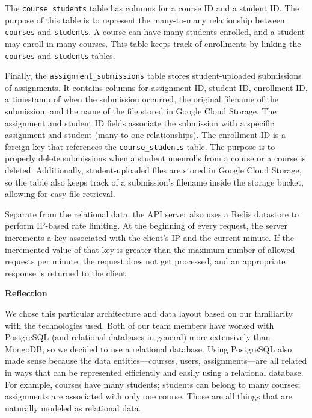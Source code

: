 \documentclass[11pt]{article}
\begin{document}
The \texttt{course\_students} table has columns for a course ID and a student ID. The purpose of this table is to represent the many-to-many relationship between \texttt{courses} and \texttt{students}. A course can have many students enrolled, and a student may enroll in many courses. This table keeps track of enrollments by linking the \texttt{courses} and \texttt{students} tables.

Finally, the \texttt{assignment\_submissions} table stores student-uploaded submissions of assignments. It contains columns for assignment ID, student ID, enrollment ID, a timestamp of when the submission occurred, the original filename of the submission, and the name of the file stored in Google Cloud Storage. The assignment and student ID fields associate the submission with a specific assignment and student (many-to-one relationships). The enrollment ID is a foreign key that references the \texttt{course\_students} table. The purpose is to properly delete submissions when a student unenrolls from a course or a course is deleted. Additionally, student-uploaded files are stored in Google Cloud Storage, so the table also keeps track of a submission's filename inside the storage bucket, allowing for easy file retrieval.

Separate from the relational data, the API server also uses a Redis datastore to perform IP-based rate limiting. At the beginning of every request, the server increments a key associated with the client's IP and the current minute. If the incremented value of that key is greater than the maximum number of allowed requests per minute, the request does not get processed, and an appropriate response is returned to the client.

\bigskip
\bigskip

\noindent
{\huge\textbf{Reflection}}\bigskip

We chose this particular architecture and data layout based on our familiarity with the technologies used. Both of our team members have worked with PostgreSQL (and relational databases in general) more extensively than MongoDB, so we decided to use a relational database. Using PostgreSQL also made sense because the data entities---courses, users, assignments---are all related in ways that can be represented efficiently and easily using a relational database. For example, courses have many students; students can belong to many courses; assignments are associated with only one course. Those are all things that are naturally modeled as relational data.
\end{document}
